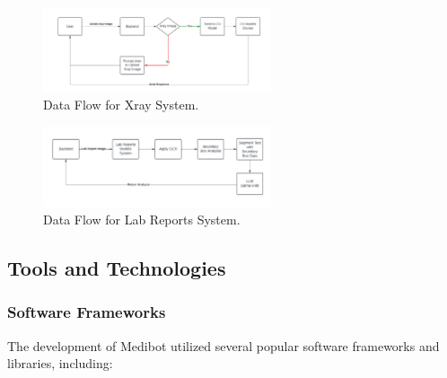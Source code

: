 \begin{figure}[H]
    \centering
    \includegraphics[width=0.6\textwidth]{./Figures/Dataflow Xray.png}
    \caption{Data Flow for Xray System.}
    \label{fig:dataflow-xray-system}
\end{figure}

\begin{figure}[H]
    \centering
    \includegraphics[width=0.6\textwidth]{./Figures/Dataflow Lab Reports.png}
    \caption{Data Flow for Lab Reports System.}
    \label{fig:dataflow-lab-reports-system}
\end{figure}


\subsection{Tools and Technologies}

\subsubsection{Software Frameworks}
The development of Medibot utilized several popular software frameworks and libraries, including:

